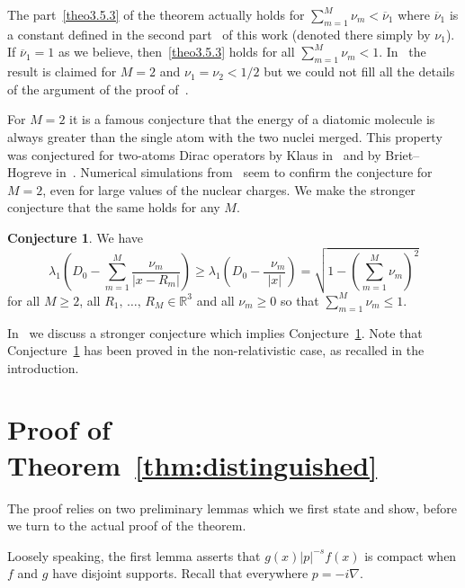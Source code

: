 \documentclass[10pt]{amsart}
\theoremstyle{definition}
\newtheorem{conjecture}[cdrthm]{Conjecture}
\newcommand{\R}{\mathbb{R}}
\newcommand\1{{\ensuremath {\mathds 1} }}
\renewcommand{\geq}{\geqslant}
\renewcommand{\leq}{\leqslant}
\begin{document}
The part~\eqref{theo3.5.3}  of the theorem actually holds for $\sum_{m=1}^M\nu_m<\overline{\nu}_1$ where $\overline{\nu}_1$ is a constant defined in the second part~\cite{EstLewSer-21b} of this work (denoted there simply by $\nu_1$). If $\overline\nu_1=1$ as we believe, then~\eqref{theo3.5.3} holds for all $\sum_{m=1}^M\nu_m<1$. In~\cite{BriHog-03} the result is claimed for $M=2$ and $\nu_1=\nu_2<1/2$ but we could not fill all the details of the argument of the proof of~\cite[Lemma~3.1]{BriHog-03}.

For $M=2$ it is a famous conjecture that the energy of a diatomic molecule is always greater than the single atom with the two nuclei merged. This property was conjectured for two-atoms Dirac operators by Klaus in~\cite[p.~478]{Klaus-80b} and by Briet--Hogreve in~\cite[Section~2.4]{BriHog-03}. Numerical simulations from~\cite{ArtSurIndPluSto-10,McConnell-13} seem to confirm the conjecture for $M=2$, even for large values of the nuclear charges. We make the stronger conjecture that the same holds for any $M$.

\begin{conjecture}\label{conjecture_multicenter}
We have
\begin{equation}
\lambda_1\left(D_0-\sum_{m=1}^M\frac{\nu_m}{\left|x-R_m\right|}\right)\geq \lambda_1\left(D_0-\frac{\mathop{\sum\limits_{m=1}^M}\nu_m}{|x|}\right)=\sqrt{1-\left(\sum_{m=1}^M\nu_m\right)^2}
\end{equation}
for all $M\geq2$, all $R_1,\,\dots,\,R_M\in\R^3$ and all $\nu_m\geq0$ so that $\sum_{m=1}^M\nu_m\leq1$.
\end{conjecture}

In~\cite{EstLewSer-21b} we discuss a stronger conjecture which implies Conjecture~\ref{conjecture_multicenter}. Note that Conjecture~\ref{conjecture_multicenter} has been proved in the non-relativistic case, as recalled in the introduction.



\section{Proof of Theorem~\ref{thm:distinguished}}\label{sec:proof_distinguished}


The proof relies on two preliminary lemmas which we first state and show, before we turn to the actual proof of the theorem.

Loosely speaking, the first lemma asserts that $g(x)|p|^{-s}f(x)$ is compact when $f$ and $g$ have disjoint supports. Recall that everywhere $p=-i\nabla$.
\end{document}
